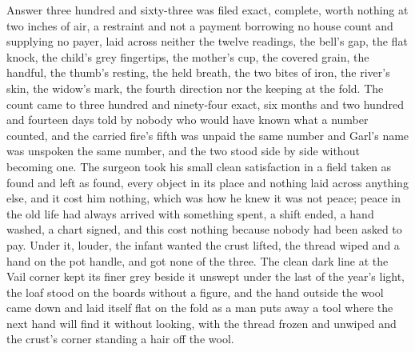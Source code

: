 Answer three hundred and sixty-three was filed exact, complete, worth nothing at two inches of air, a restraint and not a payment borrowing no house count and supplying no payer, laid across neither the twelve readings, the bell's gap, the flat knock, the child's grey fingertips, the mother's cup, the covered grain, the handful, the thumb's resting, the held breath, the two bites of iron, the river's skin, the widow's mark, the fourth direction nor the keeping at the fold. The count came to three hundred and ninety-four exact, six months and two hundred and fourteen days told by nobody who would have known what a number counted, and the carried fire's fifth was unpaid the same number and Garl's name was unspoken the same number, and the two stood side by side without becoming one. The surgeon took his small clean satisfaction in a field taken as found and left as found, every object in its place and nothing laid across anything else, and it cost him nothing, which was how he knew it was not peace; peace in the old life had always arrived with something spent, a shift ended, a hand washed, a chart signed, and this cost nothing because nobody had been asked to pay. Under it, louder, the infant wanted the crust lifted, the thread wiped and a hand on the pot handle, and got none of the three. The clean dark line at the Vail corner kept its finer grey beside it unswept under the last of the year's light, the loaf stood on the boards without a figure, and the hand outside the wool came down and laid itself flat on the fold as a man puts away a tool where the next hand will find it without looking, with the thread frozen and unwiped and the crust's corner standing a hair off the wool.
